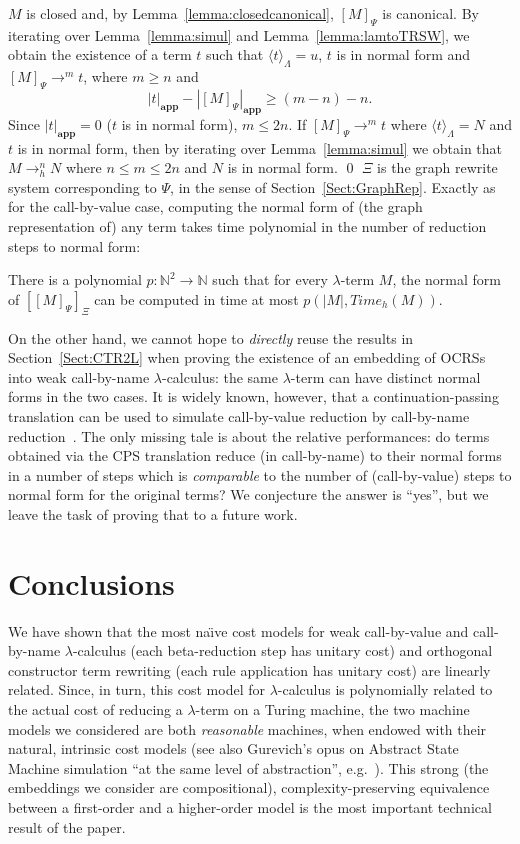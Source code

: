 \documentclass{LMCS}
\newcommand{\lambdaone}{M}
\newcommand{\lambdatwo}{N}
\newcommand{\termone}{t}
\newcommand{\termtwo}{u}
\newcommand{\appTRS}{\mathbf{app}}
\newcommand{\TRSWtolambda}[1]{\langle #1\rangle_{\Lambdaterms}}
\newcommand{\TRStoGRSW}[1]{[#1]_{\Xi}}
\newcommand{\LambdatoTRSW}[1]{[#1]_{\Psi}}
\newcommand{\Lambdaterms}{\Lambda}
\newcommand{\GRSW}{\Xi}
\newcommand{\TRSW}{\Psi}
\newcommand{\Timew}[1]{\mathit{Time}_h(#1)}
\newcommand{\rewrTRSW}{\rightarrow}
\newcommand{\rewrlambdah}{\rightarrow_h}
\newcommand{\N}{\mathbb{N}}
\newcommand{\plength}[2]{|#1|_{#2}}
\newcounter{number}
\begin{document}
$\lambdaone$ is closed and, by Lemma~\ref{lemma:closedcanonical}, $\LambdatoTRSW{\lambdaone}$
is canonical. By iterating over Lemma~\ref{lemma:simul} and Lemma~\ref{lemma:lamtoTRSW},
we obtain the existence of a term $\termone$ such that $\TRSWtolambda{\termone}=\termtwo$,
$\termone$ is in normal form and $\LambdatoTRSW{\lambdaone}\rewrTRSW^m\termone$, where $m\geq n$ and
$$
\plength{\termone}{\appTRS}-\plength{\LambdatoTRSW{\lambdaone}}{\appTRS}\geq (m-n)-n.
$$
Since $\plength{\termone}{\appTRS}=0$ ($\termone$ is in normal form), $m\leq 2n$.
If $\LambdatoTRSW{\lambdaone}\rewrTRSW^m\termone$ where
$\TRSWtolambda{\termone}=\lambdatwo$ and $\termone$ is in normal form, then
by iterating over Lemma~\ref{lemma:simul} we obtain that $\lambdaone\rewrlambdah^n\lambdatwo$
where $n\leq m\leq 2n$ and $\lambdatwo$ is in normal form.
\qed
$\GRSW$ is the graph rewrite system corresponding to $\TRSW$, in the sense of
Section~\ref{Sect:GraphRep}. Exactly as for the call-by-value case, computing the normal
form of (the graph representation of) any term takes time polynomial in the
number of reduction steps to normal form:
\begin{thm}\label{thm:mainw}
There is a polynomial $p:\N^2\rightarrow\N$ such that for every $\lambda$-term $\lambdaone$,
the normal form of $\TRStoGRSW{\LambdatoTRSW{\lambdaone}}$ can be computed in time at most 
$p(|\lambdaone|,\Timew{\lambdaone})$.
\end{thm}
On the other hand, we cannot hope to \emph{directly} reuse the results in Section~\ref{Sect:CTR2L}
when proving the existence of an embedding of OCRSs into weak call-by-name 
$\lambda$-calculus: the same $\lambda$-term can have distinct normal forms in the two cases. 
It is widely known, however, that a continuation-passing translation
can be used to simulate call-by-value reduction by call-by-name reduction~\cite{Plotkin75tcs}.
The only missing tale is about the relative performances: do terms obtained via the CPS 
translation reduce (in call-by-name) to their normal forms in a number of
steps which is \emph{comparable} to the number of (call-by-value) steps to normal form
for the original terms? We conjecture the answer is ``yes'', but we leave the task of proving that
to a future work.
\section{Conclusions}
We have shown that the most na\"\i{}ve cost models for weak call-by-value 
and call-by-name
$\lambda$-calculus
(each beta-reduction step has unitary cost)
and orthogonal constructor term rewriting (each rule application has unitary cost)
are linearly related. Since, in turn, this cost model for
$\lambda$-calculus is polynomially related to the actual cost of reducing
a $\lambda$-term on a Turing machine, 
the two machine models we considered are both \emph{reasonable} machines, when
endowed with their natural, intrinsic cost models (see also Gurevich's opus on Abstract State Machine
simulation ``at the same level of abstraction'', e.g.~\cite{Gurevich}).
This strong (the embeddings we consider are compositional), complexity-preserving
equivalence between a first-order and a higher-order model is the most important technical
result of the paper. 
\end{document}
